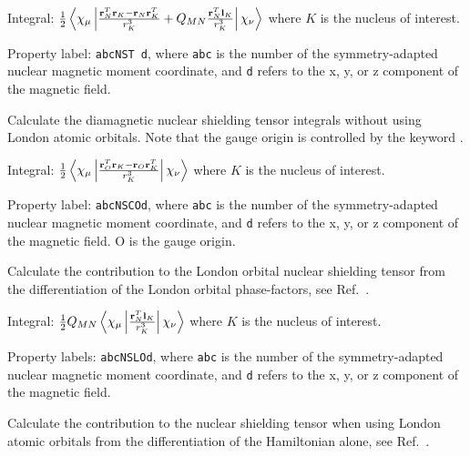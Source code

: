 \begin{description}
\begin{list}{}{}
\item Integral:
$\frac{1}{2}\left<\chi_{\mu}\left|\frac{{\bf r}_N^T{\bf r}_K -
{\bf r}_N{\bf r}_K^T}{r_{K}^3} + Q_{MN}\frac{{\bf r}_N^T{\bf
l}_K}{r_{K}^3}\right|\chi_{\nu}\right>$
where $K$ is the nucleus of interest.
\item Property label: \verb|abcNST d|, where \verb|abc| is the number
of the symmetry-adapted nuclear magnetic moment coordinate, and
\verb|d| refers to the x, y, or z component of the magnetic field.
\end{list}

\item[\Key{NSTCGO}] Calculate the diamagnetic nuclear shielding
tensor integrals without using London atomic orbitals. Note that the gauge origin is controlled by the keyword
.

\begin{list}{}{}
\item Integral:
$\frac{1}{2}\left<\chi_{\mu}\left|\frac{{\bf r}_O^T{\bf r}_K -
{\bf r}_O{\bf r}_K^T}{r_{K}^3}\right|\chi_{\nu}\right>$
where $K$ is the nucleus of interest.
\item Property label: \verb|abcNSCOd|, where \verb|abc| is the number
of the symmetry-adapted nuclear magnetic moment coordinate, and
\verb|d| refers to the x, y, or z component of the magnetic field. O
is the gauge origin.
\end{list}

\item[\Key{NSTLON}] Calculate the contribution to the London orbital nuclear
shielding tensor from the differentiation of the London orbital
phase-factors, see Ref.~\cite{thpjjcp95}.

\begin{list}{}{}
\item Integral:
$\frac{1}{2}Q_{MN}\left<\chi_{\mu}\left|\frac{{\bf r}_N^T{\bf
l}_K}{r_{K}^3}\right|\chi_{\nu}\right>$
where $K$ is the nucleus of interest.
\item Property labels: \verb|abcNSLOd|, where \verb|abc| is the number
of the symmetry-adapted nuclear magnetic moment coordinate, and
\verb|d| refers to the x, y, or z component of the magnetic field.
\end{list}

\item[\Key{NSTNOL}] Calculate the contribution to the nuclear
shielding tensor when using London atomic orbitals from the 
differentiation of the Hamiltonian alone, see Ref.~\cite{thpjjcp95}.


\end{description}
